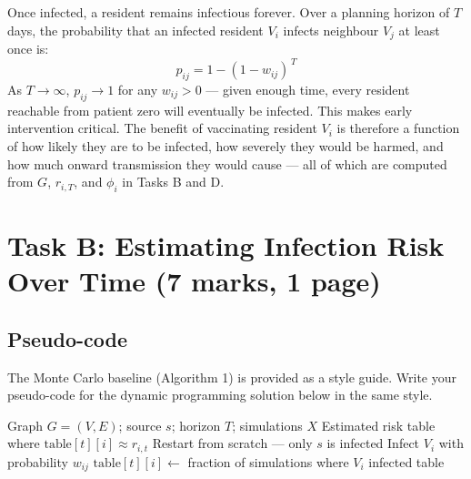 \documentclass[12pt,a4paper]{article}
\begin{document}
Once infected, a resident remains infectious forever. Over a 
planning horizon of $T$ days, the probability that an infected 
resident $V_i$ infects neighbour $V_j$ at least once is:
\[
    p_{ij} = 1 - (1 - w_{ij})^{\,T}
\]
As $T \to \infty$, $p_{ij} \to 1$ for any $w_{ij} > 0$ --- 
given enough time, every resident reachable from patient zero 
will eventually be infected. This makes early intervention 
critical. The benefit of vaccinating resident $V_i$ is therefore 
a function of how likely they are to be infected, how severely 
they would be harmed, and how much onward transmission they 
would cause --- all of which are computed from $G$, $r_{i,T}$, 
and $\phi_i$ in Tasks B and D.

\newpage

\section*{Task B: Estimating Infection Risk Over Time (7 marks, 1 page)}

\subsection*{Pseudo-code}


The Monte Carlo baseline (Algorithm 1) is provided as a style guide. Write your pseudo-code for the dynamic programming solution below in the same style.

\begin{algorithm}
\caption{MonteCarlo$(G,\ s,\ T,\ X)$}
\label{alg:mc}
\begin{algorithmic}[1]
\Require Graph $G = (V, E)$; source $s$; horizon $T$; simulations $X$
\Ensure Estimated risk table where $\text{table}[t][i] \approx r_{i,t}$
        \State Restart from scratch --- only $s$ is infected
                    \State Infect $V_i$ with probability $w_{ij}$
                \EndFor
            \EndFor
        \EndFor
    \EndFor
    \State $\text{table}[t][i] \gets$ fraction of simulations where $V_i$ infected
\EndFor
\State \Return table
\end{algorithmic}
\end{algorithm}
\end{document}
